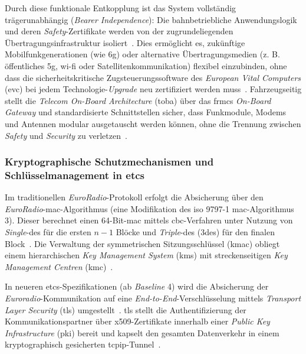 \documentclass[runningheads]{res/llncs}
\begin{document}
Durch diese funktionale Entkopplung ist das System vollständig trägerunabhängig (\textit{Bearer Independence}): Die bahnbetriebliche Anwendungslogik und deren \textit{Safety}-Zertifikate werden von der zugrundeliegenden Übertragungsinfrastruktur isoliert~\parencite[S. 123, 211]{trinckaufETCS2024}. Dies ermöglicht es, zukünftige Mobilfunkgenerationen (wie \gls{6g}) oder alternative Übertragungsmedien (z. B. öffentliches \gls{5g}, \gls{wi-fi} oder Satellitenkommunikation) flexibel einzubinden, ohne dass die sicherheitskritische Zugsteuerungssoftware des \textit{European Vital Computers} (\gls{evc}) bei jedem Technologie-\textit{Upgrade} neu zertifiziert werden muss~\parencite[S. 123, 211]{trinckaufETCS2024}. Fahrzeugseitig stellt die \textit{Telecom On-Board Architecture} (\gls{toba}) über das \gls{frmcs} \textit{On-Board Gateway} und standardisierte Schnittstellen sicher, dass Funkmodule, Modems und Antennen modular ausgetauscht werden können, ohne die Trennung zwischen \textit{Safety} und \textit{Security} zu verletzen~\parencite[S. 123, 219]{trinckaufETCS2024}.

\subsubsection{\texorpdfstring{Kryptographische Schutzmechanismen und Schlüsselmanagement in \gls{etcs}}{Kryptographische Schutzmechanismen und Schlüsselmanagement in ETCS}}
\label{sec:Kryptographische_Schutzmechanismen_und_Schlüsselmanagement_in_ETCS}
Im traditionellen \textit{EuroRadio}-Protokoll erfolgt die Absicherung über den \textit{EuroRadio}-\gls{mac}-Algorithmus %
(eine Modifikation des \gls{iso} 9797-1 \gls{mac}-Algorithmus 3). Dieser berechnet einen 64-Bit-\gls{mac} mittels \gls{cbc}-Verfahren unter Nutzung von \textit{Single}-\gls{des} für die ersten $n-1$ Blöcke und \textit{Triple}-\gls{des} (\gls{3des}) für den finalen Block~\parencite[S. 751]{chothiaAttack2017}. Die Verwaltung der symmetrischen Sitzungsschlüssel (\gls{kmac}) obliegt einem hierarchischen \textit{Key Management System} (\gls{kms}) mit streckenseitigen \textit{Key Management Centren} (\gls{kmc})~\parencite[S. 90, 100]{trinckaufETCS2024}.

In neueren \gls{etcs}-Spezifikationen (ab \textit{Baseline} 4) wird die Absicherung der \textit{Euroradio}-Kommunikation auf eine \textit{End-to-End}-Verschlüsselung mittels \textit{Transport Layer Security} (\gls{tls}) umgestellt~\parencite[S. 211]{trinckaufETCS2024}. \gls{tls} stellt die Authentifizierung der Kommunikationspartner über \gls{x509}-Zertifikate innerhalb einer \textit{Public Key Infrastructure} (\gls{pki}) bereit und kapselt den gesamten Datenverkehr in einem kryptographisch gesicherten \gls{tcpip}-Tunnel~\parencite[S. 105, 211]{trinckaufETCS2024}.
\end{document}
